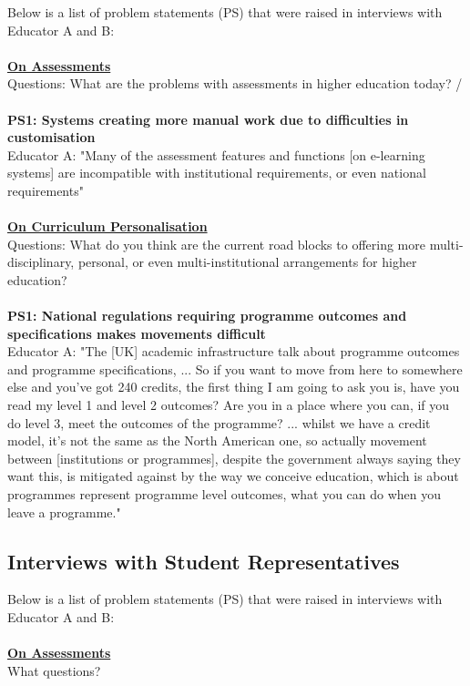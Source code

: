 Below is a list of problem statements (PS) that were raised in interviews with Educator A and B:\\
\\
\underline{\textbf{On Assessments}}
\\
Questions: What are the problems with assessments in higher education today? / \\
\\
\textbf{PS1: Systems creating more manual work due to difficulties in customisation}\\
Educator A: "Many of the assessment features and functions [on e-learning systems] are incompatible 
with institutional requirements, or even national requirements"\\
\\
\underline{\textbf{On Curriculum Personalisation}}
\\
Questions: What do you think are the current road blocks to offering more multi-disciplinary, personal, 
or even multi-institutional arrangements for higher education?\\
\\
\textbf{PS1: National regulations requiring programme outcomes and specifications makes movements 
difficult}\\
Educator A: "The [UK] academic infrastructure talk about programme outcomes and programme specifications,
... So if you want to move from here to somewhere else and you’ve got 240 credits, the first thing I am 
going to ask you is, have you read my level 1 and level 2 outcomes? Are you in a place where you can, 
if you do level 3, meet the outcomes of the programme? ... whilst we have a credit model, it’s not the 
same as the North American one, so actually movement between [institutions or programmes], despite the 
government always saying they want this, is mitigated against by the way we conceive education, 
which is about programmes represent programme level outcomes, what you can do when you leave a programme."

\subsection{Interviews with Student Representatives}

Below is a list of problem statements (PS) that were raised in interviews with Educator A and B:\\
\\
\underline{\textbf{On Assessments}}
\\
What questions?

